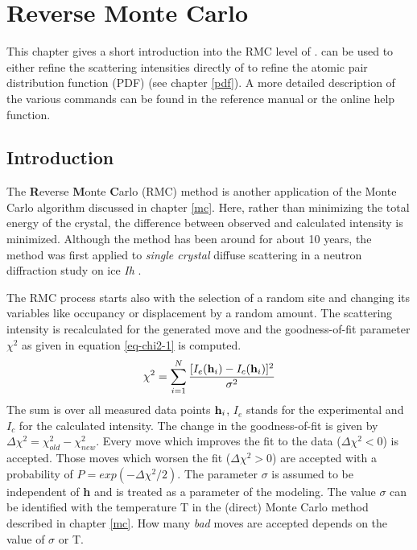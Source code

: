 
\chapter{Reverse Monte Carlo \label{rmc}}

This chapter gives a short introduction into the RMC level of 
\discus. \Discus can be used to either refine the scattering
intensities directly of to refine the atomic pair distribution
function (PDF) (see chapter \ref{pdf}). A more detailed description of the
various commands can be found in the reference manual or the online
help function.


\section{Introduction \label{rmc-int}}

The {\bf R}everse {\bf M}onte {\bf C}arlo (RMC) method
\citep{mcpu88} is another application of the Monte Carlo algorithm
discussed in chapter \ref{mc}.  Here, rather than minimizing the
total energy of the crystal, the difference between observed and
calculated intensity is minimized. Although the method has been
around for about 10 years, the method was first applied to {\it
single crystal} diffuse scattering in a neutron diffraction study on
ice {\it Ih} \citep{nikemc95}. \par

The RMC process starts also with the selection of a random site
and changing its variables like occupancy or displacement by a
random amount. The scattering intensity is recalculated for the
generated move and the goodness-of-fit parameter $\chi^{2}$ as
given in equation \ref{eq-chi2-1} is computed.
%
\begin{equation}
    \chi^{2} = \sum_{i=1}^{N} \frac { [ I_{e}({\bf h}_{i}) -
               I_{c}({\bf h}_{i}) ] ^{2}} { \sigma^{2} }
    \label{eq-chi2-1}
\end{equation}
%
The sum is over all measured data points ${\bf h}_{i}$, $I_{e}$
stands for the experimental and $I_{c}$ for the calculated
intensity.  The change in the goodness-of-fit is given by $\Delta
\chi^{2} = \chi_{old}^{2} - \chi_{new}^{2}$.  Every move which
improves the fit to the data ($\Delta \chi^{2} < 0$) is accepted.
Those moves which worsen the fit ($\Delta \chi^{2} > 0$) are
accepted with a probability of $P = exp(-\Delta \chi^{2} / 2)$. The
parameter $\sigma$ is assumed to be independent of {\bf h} and is
treated as a parameter of the modeling.  The value $\sigma$ can be
identified with the temperature T in the (direct) Monte Carlo method
described in chapter \ref{mc}.  How many {\it bad} moves are
accepted depends on the value of $\sigma$ or T.  \par

